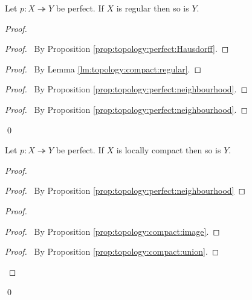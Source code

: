   \begin{prop}
 Let $p : X \twoheadrightarrow Y$ be perfect. If $X$ is regular then so is
$Y$.
\end{prop}

\begin{proof}
 \pf
 \begin{proof}
   \pf\ By Proposition \ref{prop:topology:perfect:Hausdorff}.
 \end{proof}
 \begin{proof}
   \pf\ By Lemma \ref{lm:topology:compact:regular}.
 \end{proof}
 \begin{proof}
   \pf\ By Proposition \ref{prop:topology:perfect:neighbourhood}.
 \end{proof}
 \begin{proof}
   \pf\ By Proposition \ref{prop:topology:perfect:neighbourhood}.
 \end{proof}
 \qed
\end{proof}

  \begin{prop}[AC]
 Let $p : X \twoheadrightarrow Y$ be perfect. If $X$ is locally compact then
 so is $Y$.
\end{prop}

\begin{proof}
 \pf
 \begin{proof}
   \pf\ By Proposition \ref{prop:topology:perfect:neighbourhood}
 \end{proof}
 \begin{proof}
   \begin{proof}
     \pf\ By Proposition \ref{prop:topology:compact:image}.
   \end{proof}
   \qedstep
   \begin{proof}
      \pf\ By Proposition \ref{prop:topology:compact:union}.
    \end{proof}
 \end{proof}
 \qed
\end{proof}


